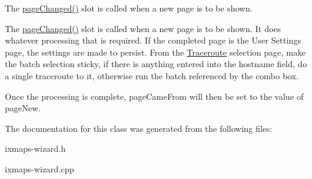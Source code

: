 The \hyperlink{classIXmapsWizard_b064d0cb97a40abc8ea405e7001fcce9}{pageChanged()} slot is called when a new page is to be shown. 

The \hyperlink{classIXmapsWizard_b064d0cb97a40abc8ea405e7001fcce9}{pageChanged()} slot is called when a new page is to be shown. It does whatever processing that is required. If the completed page is the User Settings page, the settings are made to persist. From the \hyperlink{classTraceroute}{Traceroute} selection page, make the batch selection sticky, if there is anything entered into the hostname field, do a single traceroute to it, otherwise run the batch referenced by the combo box.

Once the processing is complete, pageCameFrom will then be set to the value of pageNew. 

The documentation for this class was generated from the following files:\begin{CompactItemize}
\item 
ixmaps-wizard.h\item 
ixmaps-wizard.cpp\end{CompactItemize}
